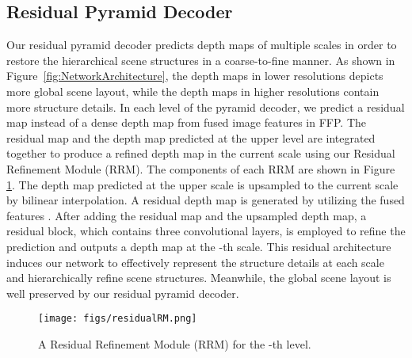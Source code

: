 \documentclass{article}
\begin{document}
\subsection{Residual Pyramid Decoder}
\label{sec:RPD}
Our residual pyramid decoder predicts depth maps of multiple scales in order to restore the hierarchical scene structures in a coarse-to-fine manner. 
As shown in Figure~\ref{fig:NetworkArchitecture}, the depth maps in lower resolutions depicts more global scene layout, while the depth maps in higher resolutions contain more structure details.
In each level of the pyramid decoder, we predict a residual map instead of a dense depth map from fused image features in FFP.
The residual map and the depth map predicted at the upper level are integrated together to produce a refined depth map in the current scale using our Residual Refinement Module (RRM). 
The components of each RRM are shown in Figure \ref{fig:residualRM}.
The depth map  predicted at the upper scale is upsampled to the current scale by bilinear interpolation. 
A residual depth map  is generated by utilizing the fused features . 
After adding the residual map and the upsampled depth map, a residual block, which contains three convolutional layers, is employed to refine the prediction and outputs a depth map  at the -th scale.
This residual architecture induces our network to effectively represent the structure details at each scale and hierarchically refine scene structures.
Meanwhile, the global scene layout is well preserved by our residual pyramid decoder.

\begin{figure}[t]
	\centering 
	\texttt{[image: figs/residualRM.png]}
	\caption{A Residual Refinement Module (RRM) for the -{th} level.}
	\label{fig:residualRM}
\end{figure} 
\end{document}
